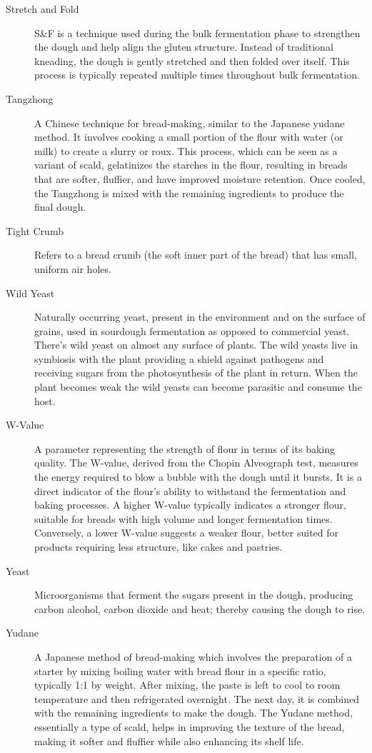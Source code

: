 \begin{description}
\item[Stretch and Fold] S\&F is a technique used during the bulk fermentation phase
to strengthen the dough and help align the gluten structure. Instead of traditional
kneading, the dough is gently stretched and then folded over itself. This process is
typically repeated multiple times throughout bulk fermentation.

\item[Tangzhong] A Chinese technique for bread-making, similar to the
Japanese yudane method. It involves cooking a small portion of the flour
with water (or milk) to create a slurry or roux. This process, which can be seen as a
variant of scald, gelatinizes the starches in the flour, resulting in breads
that are softer, fluffier, and have improved moisture retention. Once cooled, the
Tangzhong is mixed with the remaining ingredients to produce the final dough.

\item[Tight Crumb] Refers to a bread crumb (the soft inner part of the bread) that
has small, uniform air holes.

\item[Wild Yeast] Naturally occurring yeast, present in the environment and on the
surface of grains, used in sourdough fermentation as opposed to commercial yeast.
There’s wild yeast on almost any surface of plants. The wild yeasts live in symbiosis
with the plant providing a shield against pathogens and receiving sugars from the
photosynthesis of the plant in return. When the plant becomes weak the wild yeasts
can become parasitic and consume the host.

\item[W-Value] A parameter representing the strength of flour in terms of its
baking quality. The W-value, derived from the Chopin Alveograph test,
measures the energy required to blow a bubble with the dough until it bursts.
It is a direct indicator of the flour's ability to withstand the fermentation
and baking processes. A higher W-value typically indicates a stronger
flour, suitable for breads with high volume and longer fermentation times.
Conversely, a lower W-value suggests a weaker flour, better suited for
products requiring less structure, like cakes and pastries.

\item[Yeast] Microorganisms that ferment the sugars present in the dough, producing
carbon alcohol, carbon dioxide and heat; thereby causing the dough to rise.

\item[Yudane] A Japanese method of bread-making which involves the preparation
of a starter by mixing boiling water with bread flour in a specific ratio, typically 1:1
by weight. After mixing, the paste is left to cool to room temperature and then
refrigerated overnight. The next day, it is combined with the remaining ingredients
to make the dough. The Yudane method, essentially a type of scald, helps in
improving the texture of the bread, making it softer and fluffier while also enhancing
its shelf life.

\end{description}
